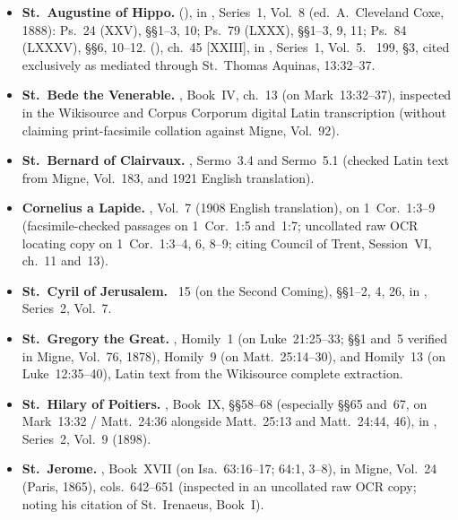 \begin{itemize}[leftmargin=1.5em,itemsep=0.35em]
\item \textbf{St.~Augustine of Hippo.}  (), in , Series~1, Vol.~8 (ed.\ A.~Cleveland Coxe, 1888): Ps.~24 (XXV), §§1--3, 10; Ps.~79 (LXXX), §§1--3, 9, 11; Ps.~84 (LXXXV), §§6, 10--12.  (), ch.~45 [XXIII], in , Series~1, Vol.~5. ~199, §3, cited exclusively as mediated through St.~Thomas Aquinas,  13:32--37.

\item \textbf{St.~Bede the Venerable.} , Book~IV, ch.~13 (on Mark~13:32--37), inspected in the Wikisource and Corpus Corporum digital Latin transcription (without claiming print-facsimile collation against Migne,  Vol.~92).

\item \textbf{St.~Bernard of Clairvaux.} , Sermo~3.4 and Sermo~5.1 (checked Latin text from Migne,  Vol.~183, and 1921 English translation).

\item \textbf{Cornelius a Lapide.} , Vol.~7 (1908 English translation), on 1~Cor.~1:3--9 (facsimile-checked passages on 1~Cor.~1:5 and~1:7; uncollated raw OCR locating copy on 1~Cor.~1:3--4, 6, 8--9; citing Council of Trent, Session~VI, ch.~11 and~13).

\item \textbf{St.~Cyril of Jerusalem.} ~15 (on the Second Coming), §§1--2, 4, 26, in , Series~2, Vol.~7.

\item \textbf{St.~Gregory the Great.} , Homily~1 (on Luke~21:25--33; §§1 and~5 verified in Migne,  Vol.~76, 1878), Homily~9 (on Matt.~25:14--30), and Homily~13 (on Luke~12:35--40), Latin text from the Wikisource complete extraction.

\item \textbf{St.~Hilary of Poitiers.} , Book~IX, §§58--68 (especially §§65 and~67, on Mark~13:32 / Matt.~24:36 alongside Matt.~25:13 and Matt.~24:44, 46), in , Series~2, Vol.~9 (1898).

\item \textbf{St.~Jerome.} , Book~XVII (on Isa.~63:16--17; 64:1, 3--8), in Migne,  Vol.~24 (Paris, 1865), cols.~642--651 (inspected in an uncollated raw OCR copy; noting his citation of St.~Irenaeus,  Book~I).


\end{itemize}
